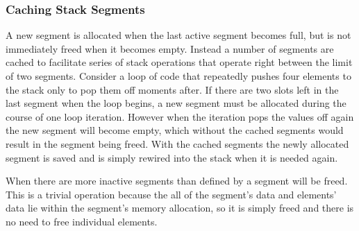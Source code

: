 \subsubsection{Caching Stack Segments}

A new segment is allocated when the last active segment becomes full, but is not
immediately freed when it becomes empty. Instead a number of segments are cached
to facilitate series of stack operations that operate right between the limit of
two segments. Consider a loop of code that repeatedly pushes four elements to
the stack only to pop them off moments after. If there are two slots left in the
last segment when the loop begins, a new segment must be allocated during the
course of one loop iteration. However when the iteration pops the values off
again the new segment will become empty, which without the cached segments would
result in the segment being freed. With the cached segments the newly allocated
segment is saved and is simply rewired into the stack when it is needed again.

When there are more inactive segments than defined by
 a segment will be freed. This is a trivial
operation because the all of the segment's data and elements' data lie within
the segment's memory allocation, so it is simply freed and there is no need to
free individual elements.

